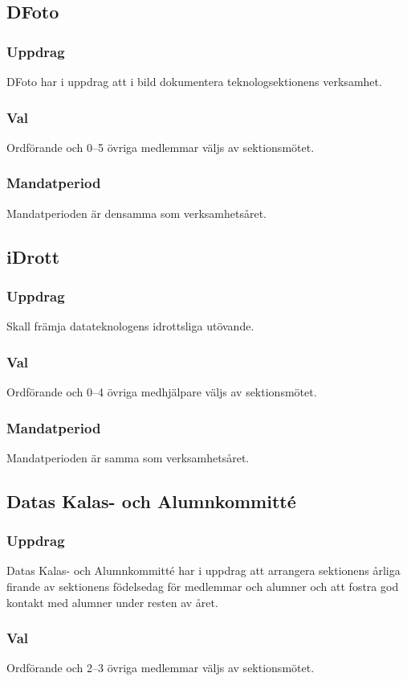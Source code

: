 \subsection{DFoto}
\subsubsection{Uppdrag}
DFoto har i uppdrag att i bild dokumentera teknologsektionens verksamhet.
\subsubsection{Val}
Ordförande och 0--5 övriga medlemmar väljs av sektionsmötet.
\subsubsection{Mandatperiod}
Mandatperioden är densamma som verksamhetsåret.

\subsection{iDrott}
\subsubsection{Uppdrag}
Skall främja datateknologens idrottsliga utövande. 
\subsubsection{Val}
Ordförande och 0--4 övriga medhjälpare väljs av sektionsmötet. 
\subsubsection{Mandatperiod}
Mandatperioden är samma som verksamhetsåret. 

\subsection{Datas Kalas- och Alumnkommitté}
\subsubsection{Uppdrag}
Datas Kalas- och Alumnkommitté har i uppdrag att arrangera sektionens årliga firande av sektionens födelsedag för medlemmar och alumner och att fostra god kontakt
med alumner under resten av året.
\subsubsection{Val}
Ordförande och 2--3 övriga medlemmar väljs av sektionsmötet.
